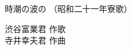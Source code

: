 \documentclass[10pt,b5j]{tarticle} %
\begin{document}
\begin{minipage}[c]{0.7\hsize} %
    \begin{center}
        {\LARGE
            時潮の波の %
        }
        {\small 
            （昭和二十一年寮歌） %
        }
    \end{center}
\end{minipage}
\begin{minipage}[c]{0.3\hsize} %
    \begin{flushright} %
        渋谷富業君 作歌\\寺井幸夫君 作曲 %
    \end{flushright}
\end{minipage}
\end{document}
